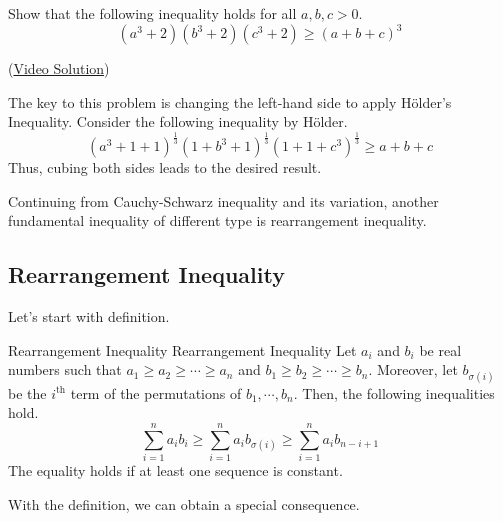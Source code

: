 \documentclass[../main.tex]{subfiles}
\begin{document}
\begin{problem}{}{}
Show that the following inequality holds for all $a, b, c > 0$.
\[
(a^3 + 2)(b^3 + 2)(c^3 + 2) \geq (a + b + c)^3
\]
\end{problem}

(\href{https://youtu.be/FUtgo54gq7I}{Video Solution})

\begin{solution}
The key to this problem is changing the left-hand side to apply
Hölder's Inequality. Consider the following inequality by Hölder.
\[
(a^3 + 1 + 1)^\frac{1}{3} (1 + b^3 + 1)^\frac{1}{3}
    (1 + 1 + c^3)^\frac{1}{3}
\geq a + b + c
\]
Thus, cubing both sides leads to the desired result.
\end{solution}

Continuing from Cauchy-Schwarz inequality and its variation, another
fundamental inequality of different type is rearrangement inequality.

\subsection{Rearrangement Inequality}

Let's start with definition.

\begin{definition}
{Rearrangement Inequality}
{Rearrangement Inequality}
Let $a_i$ and $b_i$ be real numbers such that $a_1 \geq a_2 \geq
\cdots \geq a_n$ and $b_1 \geq b_2 \geq \cdots \geq b_n$. Moreover,
let $b_{\sigma(i)}$ be the $i^\text{th}$ term of the permutations of
$b_1, \cdots, b_n$. Then, the following inequalities hold.
\[
\sum_{i=1}^n a_i b_i
\geq \sum_{i=1}^n a_i b_{\sigma(i)}
\geq \sum_{i=1}^n a_i b_{n-i+1}
\]
The equality holds if at least one sequence is constant.
\end{definition}

With the definition, we can obtain a special consequence.
\end{document}
